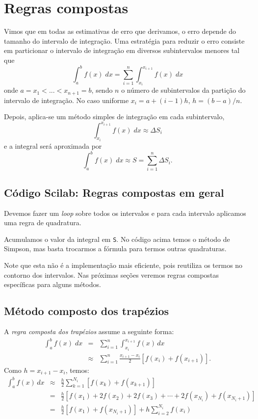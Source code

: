 \section{Regras compostas}

Vimos que em todas as estimativas de erro que derivamos, o erro depende do tamanho do intervalo de integração. Uma estratégia para reduzir o erro consiste em particionar o intervalo de integração em diversos subintervalos menores tal que
\begin{equation*}
\int_{a}^b f(x)\;dx=\sum_{i=1}^{n} \int_{x_i}^{x_{i+1}} f(x)\;dx
\end{equation*}
onde $a=x_1<...<x_{n+1}=b$, sendo $n$ o número de subintervalos da partição do intervalo de integração. No caso uniforme $x_i = a + (i-1)h$, $h = (b-a)/n$.

Depois, aplica-se um método simples de integração em cada subintervalo,
$$
\int_{x_i}^{x_{i+1}} f(x)\;dx \approx \Delta S_i
$$
e a integral será aproximada por
$$
\int_a^b f(x)\;dx \approx S= \sum_{i=1}^{n} \Delta S_i.
$$

\ifisscilab
\subsection{Código Scilab: Regras compostas em geral}
Devemos fazer um {\it loop} sobre todos os intervalos e para cada intervalo aplicamos uma regra de quadratura.



Acumulamos o valor da integral em \verb+S+. No código acima temos o método de Simpson, mas basta trocarmos a fórmula para termos outras quadraturas.

Note que esta não é a implementação mais eficiente, pois reutiliza os termos no contorno dos intervalos. Nas próximas seções veremos regras compostas específicas para alguns métodos.
\fi

\subsection{Método composto dos trapézios}
A \emph{regra composta dos trapézios} assume a seguinte forma:
\begin{eqnarray*}
  \int_{a}^b f(x)\;dx &=& \sum_{i=1}^{n} \int_{x_i}^{x_{i+1}}f(x)\,dx \\
  &\approx& \sum_{i=1}^{n} \frac{x_{i+1}-x_i}{2}\left[f(x_i)+f(x_{i+1})\right].
\end{eqnarray*}
Como $h = x_{i+1} - x_i$, temos:
\begin{eqnarray*}
\int_{a}^b f(x)\,dx &\approx& \frac{h}{2}\sum_{k=1}^{N_i}\left[f(x_k)+f(x_{k+1})\right]\\
&=& \frac{h}{2}\left[f(x_1)+2f(x_2)+2f(x_3)+\cdots + 2f(x_{N_i})+f(x_{N_i+1})\right]\\
&=& \frac{h}{2}\left[f(x_1) + f(x_{N_i+1})\right] + h\sum_{i=2}^{N_i} f(x_i)
\end{eqnarray*}

